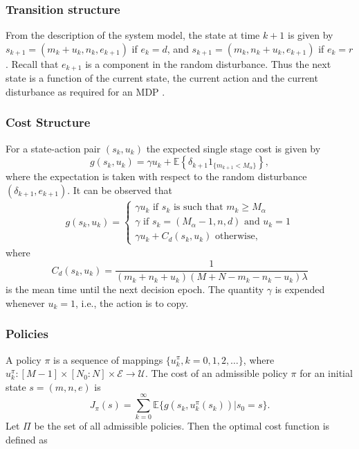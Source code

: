 \documentclass[10pt,journal,letterpaper]{IEEEtran}
\begin{document}
\subsubsection{Transition structure}
From the description of the system model, the state at time $k+1$ is given by  $s_{k+1} = (m_k + u_k,
n_k, e_{k+1})$ if $e_k  = d$, and $s_{k+1} = (m_k, n_k + u_k,
e_{k+1})$ if $e_k  = r$. Recall that $e_{k+1}$ is a component in the
random disturbance. Thus the next state is  a function of the
current state, the current action and the current disturbance as
required for an MDP .

\subsubsection{Cost Structure}
For a state-action pair $(s_k,u_k)$
the expected single stage cost is given by
\begin{equation*}
g(s_k,u_k) = \gamma u_k + \mathbb{E}\left\{\delta_{k+1}1_{\{m_{k+1}
< M_{\alpha}\}}\right\},
\end{equation*}
where the expectation is taken with respect to the random
disturbance $(\delta_{k+1},e_{k+1})$. It can be observed that
\begin{align*}
g(s_k,u_k) = \begin{cases}
             \gamma u_k \mbox{ if }  s_k \mbox{ is such that } m_k \geq M_{\alpha} \\
                 \gamma \mbox{ if } s_k  = (M_{\alpha}-1,n,d) \mbox{ and } u_k = 1\\
                 \gamma u_k + C_d(s_k,u_k) \mbox{ otherwise},\end{cases}
\end{align*}
where
\[C_d(s_k,u_k) = \frac{1}{(m_k+n_k+u_k)(M+N-m_k-n_k-u_k)\lambda}\]
 is the mean time
until the next decision epoch. The quantity $\gamma$ is expended whenever $u_k = 1$, i.e., the action is to copy.


\subsubsection{Policies} A policy $\pi$ is a sequence of mappings $\{u^{\pi}_k, k = 0,1,2,\dots\}$,
where $u^{\pi}_k: [M-1] \times [N_0:N] \times \mathcal{E}
\rightarrow \mathcal{U}$. The cost of an admissible policy $\pi$ for
an initial state $s = (m,n,e)$ is
\begin{equation*}
J_{\pi}(s) = \sum_{k = 0}^{\infty}
\mathbb{E}\Big\{g(s_k,u^{\pi}_k(s_k))\big| s_0 = s\Big\}.
\end{equation*}
Let $\Pi$  be the set of all admissible policies. Then the optimal cost function is defined as
\end{document}
